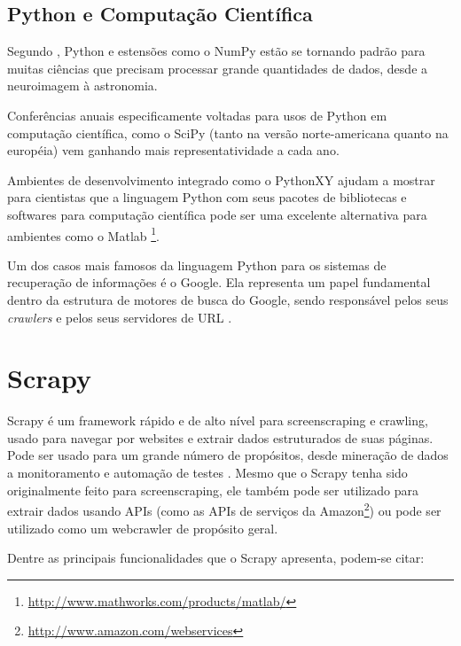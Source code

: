 \subsection{Python e Computação Científica}

Segundo \cite{python_scientific_world}, Python e estensões como o NumPy \cite{numpy} estão se tornando padrão para muitas ciências que precisam processar grande quantidades de dados, desde a neuroimagem à astronomia.

Conferências anuais especificamente voltadas para usos de Python em computação científica, como o SciPy \cite{scipy} (tanto na versão norte-americana quanto na européia) vem ganhando mais representatividade a cada ano.

Ambientes de desenvolvimento integrado como o PythonXY \cite{pythonxy} ajudam a mostrar para cientistas que a linguagem Python com seus pacotes de bibliotecas e softwares para computação científica pode ser uma excelente alternativa para ambientes como o Matlab \footnote{\url{http://www.mathworks.com/products/matlab/}}. 

Um dos casos mais famosos da linguagem Python para os sistemas de recuperação de informações é o Google\cite{google}. Ela representa um papel fundamental dentro da estrutura de motores de busca do Google, sendo responsável pelos seus \emph{crawlers} e pelos seus servidores de URL \cite{surveyir}.

\pagebreak
\section{Scrapy}

Scrapy é um framework rápido e de alto nível para \gls{screenscraping} e \gls{crawling}, usado para navegar por websites e extrair dados estruturados de suas páginas. Pode ser usado para um grande número de propósitos, desde mineração de dados a monitoramento e automação de testes \cite{scrapy}. Mesmo que o Scrapy tenha sido originalmente feito para \gls{screenscraping}, ele também pode ser utilizado para extrair dados usando APIs (como as APIs de serviços da Amazon\footnote{\url{http://www.amazon.com/webservices}}) ou pode ser utilizado como um \gls{webcrawler} de propósito geral.

Dentre as principais funcionalidades que o Scrapy apresenta, podem-se citar:

